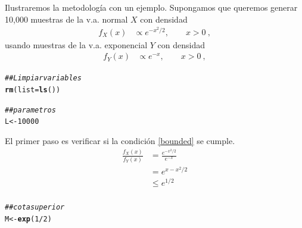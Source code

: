 \documentclass[12pt,reqno]{amsart}\usepackage[]{graphicx}\usepackage[]{color}
\makeatletter
\newcommand{\hlnum}[1]{\textcolor[rgb]{0.686,0.059,0.569}{#1}}%
\newcommand{\hlcom}[1]{\textcolor[rgb]{0.678,0.584,0.686}{\textit{#1}}}%
\newcommand{\hlopt}[1]{\textcolor[rgb]{0,0,0}{#1}}%
\newcommand{\hlstd}[1]{\textcolor[rgb]{0.345,0.345,0.345}{#1}}%
\newcommand{\hlkwb}[1]{\textcolor[rgb]{0.69,0.353,0.396}{#1}}%
\newcommand{\hlkwc}[1]{\textcolor[rgb]{0.333,0.667,0.333}{#1}}%
\newcommand{\hlkwd}[1]{\textcolor[rgb]{0.737,0.353,0.396}{\textbf{#1}}}%
\newenvironment{kframe}{%
 \def\at@end@of@kframe{}%
 \ifinner\ifhmode%
  \def\at@end@of@kframe{\end{minipage}}%
  \begin{minipage}{\columnwidth}%
 \fi\fi%
 \def\FrameCommand##1{\hskip\@totalleftmargin \hskip-\fboxsep
 \colorbox{shadecolor}{##1}\hskip-\fboxsep
     \hskip-\linewidth \hskip-\@totalleftmargin \hskip\columnwidth}%
 \MakeFramed {\advance\hsize-\width
   \@totalleftmargin\z@ \linewidth\hsize
   \@setminipage}}%
 {\par\unskip\endMakeFramed%
 \at@end@of@kframe}
\newenvironment{knitrout}{}{} %
\makeatother
\begin{document}
Ilustraremos la metodología con un ejemplo. Supongamos que queremos generar 10,000 muestras de la v.a. normal $X$ con densidad
\begin{equation}
  \begin{split}
   f_{X}(x) &\propto e^{-x^2/2},\qquad x>0\:,
  \end{split}
\end{equation}
usando muestras de la v.a. exponencial $Y$ con densidad
\begin{equation}\label{absContinuous}
  \begin{split}
   f_{Y}(x) &\propto e^{-x},\qquad  x>0\:,
  \end{split}
\end{equation}
\begin{knitrout}
\color{fgcolor}\begin{kframe}
\begin{alltt}
\hlcom{## Limpiar variables}
\hlkwd{rm}\hlstd{(}\hlkwc{list} \hlstd{=} \hlkwd{ls}\hlstd{())}

\hlcom{## parametros}
\hlstd{L} \hlkwb{<-} \hlnum{10000}
\end{alltt}
\end{kframe}
\end{knitrout}


El primer paso es verificar si la condición \eqref{bounded} se cumple.
\begin{equation*}
  \begin{split}
  \frac{ f_{X}(x) }{ f_{Y}(x) } &= \frac{e^{-x^2/2}}{e^{-x}} \\
  &= e^{x-x^2/2}\\
  &\leq e^{1/2}\\
  \end{split}
\end{equation*}
\begin{knitrout}
\color{fgcolor}\begin{kframe}
\begin{alltt}
\hlcom{## cota superior}
\hlstd{M} \hlkwb{<-} \hlkwd{exp}\hlstd{(}\hlnum{1}\hlopt{/}\hlnum{2}\hlstd{)}
\end{alltt}
\end{kframe}
\end{knitrout}
\end{document}
